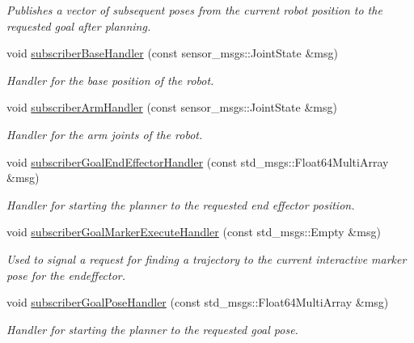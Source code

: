 \begin{DoxyCompactItemize}
\begin{DoxyCompactList}\small\item\em Publishes a vector of subsequent poses from the current robot position to the requested goal after planning. \end{DoxyCompactList}\item 
void \hyperlink{classSquirrelMotionPlanner_1_1Planner_a8af321d1e0532e1b61d64c2b8be9d48b}{subscriber\-Base\-Handler} (const sensor\-\_\-msgs\-::\-Joint\-State \&msg)
\begin{DoxyCompactList}\small\item\em Handler for the base position of the robot. \end{DoxyCompactList}\item 
void \hyperlink{classSquirrelMotionPlanner_1_1Planner_a1cc55ecbf721cb8e03bd2d1d119986b7}{subscriber\-Arm\-Handler} (const sensor\-\_\-msgs\-::\-Joint\-State \&msg)
\begin{DoxyCompactList}\small\item\em Handler for the arm joints of the robot. \end{DoxyCompactList}\item 
void \hyperlink{classSquirrelMotionPlanner_1_1Planner_a1ae3894762068a1f33732ffe0eb1a823}{subscriber\-Goal\-End\-Effector\-Handler} (const std\-\_\-msgs\-::\-Float64\-Multi\-Array \&msg)
\begin{DoxyCompactList}\small\item\em Handler for starting the planner to the requested end effector position. \end{DoxyCompactList}\item 
void \hyperlink{classSquirrelMotionPlanner_1_1Planner_ad547ede001e005bb1ceb8aa5e277f3b7}{subscriber\-Goal\-Marker\-Execute\-Handler} (const std\-\_\-msgs\-::\-Empty \&msg)
\begin{DoxyCompactList}\small\item\em Used to signal a request for finding a trajectory to the current interactive marker pose for the endeffector. \end{DoxyCompactList}\item 
void \hyperlink{classSquirrelMotionPlanner_1_1Planner_a8f43c92360856238d16e452c3dd68544}{subscriber\-Goal\-Pose\-Handler} (const std\-\_\-msgs\-::\-Float64\-Multi\-Array \&msg)
\begin{DoxyCompactList}\small\item\em Handler for starting the planner to the requested goal pose. \end{DoxyCompactList}\item 

\end{DoxyCompactItemize}

